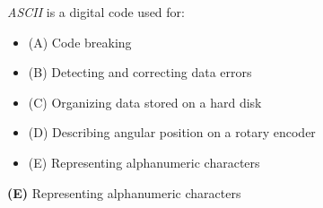 

{\it ASCII} is a digital code used for:

\begin{itemize}
\item{(A)} Code breaking
\vskip 5pt 
\item{(B)} Detecting and correcting data errors
\vskip 5pt 
\item{(C)} Organizing data stored on a hard disk
\vskip 5pt 
\item{(D)} Describing angular position on a rotary encoder
\vskip 5pt 
\item{(E)} Representing alphanumeric characters
\end{itemize}







{\bf (E)} Representing alphanumeric characters
 











